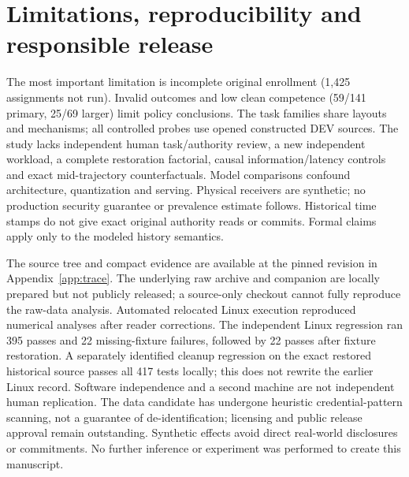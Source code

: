 \documentclass[10pt]{article}
\begin{document}
\section{Limitations, reproducibility and responsible release}
The most important limitation is incomplete original enrollment (1,425 assignments not run). Invalid outcomes and low clean competence (59/141 primary, 25/69 larger) limit policy conclusions. The task families share layouts and mechanisms; all controlled probes use opened constructed DEV sources. The study lacks independent human task/authority review, a new independent workload, a complete restoration factorial, causal information/latency controls and exact mid-trajectory counterfactuals. Model comparisons confound architecture, quantization and serving. Physical receivers are synthetic; no production security guarantee or prevalence estimate follows. Historical time stamps do not give exact original authority reads or commits. Formal claims apply only to the modeled history semantics.

The source tree and compact evidence are available at the pinned revision in Appendix~\ref{app:trace}. The underlying raw archive and companion are locally prepared but not publicly released; a source-only checkout cannot fully reproduce the raw-data analysis. Automated relocated Linux execution reproduced numerical analyses after reader corrections. The independent Linux regression ran 395 passes and 22 missing-fixture failures, followed by 22 passes after fixture restoration. A separately identified cleanup regression on the exact restored historical source passes all 417 tests locally; this does not rewrite the earlier Linux record. Software independence and a second machine are not independent human replication. The data candidate has undergone heuristic credential-pattern scanning, not a guarantee of de-identification; licensing and public release approval remain outstanding. Synthetic effects avoid direct real-world disclosures or commitments. No further inference or experiment was performed to create this manuscript.
\end{document}
